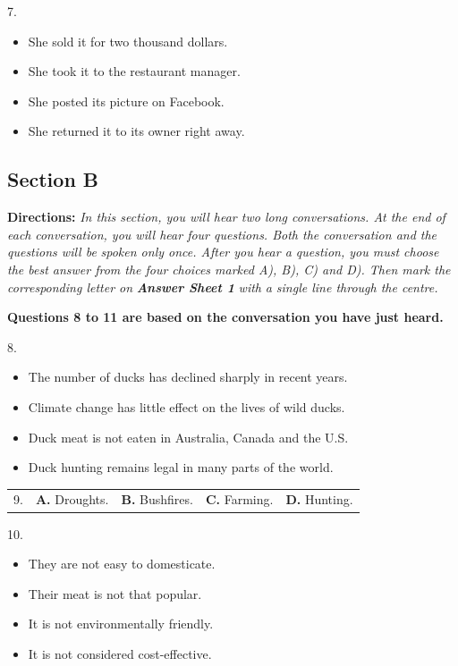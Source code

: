 \documentclass[UTF8,11pt]{ctexart}
\begin{document}
7.


\begin{itemize}[leftmargin=2em,itemsep=.2em,topsep=.4em]\item[A.] She sold it for two thousand dollars.
\item[B.] She took it to the restaurant manager.
\item[C.] She posted its picture on Facebook.
\item[D.] She returned it to its owner right away.
\end{itemize}

\subsection*{\textbf{Section B}}


\textbf{Directions: }\textit{In this section, you will hear two long conversations. At the end of each} \textit{conversation, you will hear four questions. Both the conversation and the questions will be} \textit{spoken only once. After you hear a question, you must choose the best answer from the four} \textit{choices marked A), B), C) and D). Then mark the corresponding letter on }\textbf{\textit{Answer Sheet 1 }}\textit{with} \textit{a single line through the centre.}


\textbf{Questions 8 to 11 are based on the conversation you have just heard.}


8.


\begin{itemize}[leftmargin=2em,itemsep=.2em,topsep=.4em]\item[A.] The number of ducks has declined sharply in recent years.
\item[B.] Climate change has little effect on the lives of wild ducks.
\item[C.] Duck meat is not eaten in Australia, Canada and the U.S.
\item[D.] Duck hunting remains legal in many parts of the world.
\end{itemize}

\noindent\begin{tabularx}{\linewidth}{@{}lXXXX@{}}9. & \textbf{A.} Droughts. & \textbf{B.} Bushfires. & \textbf{C.} Farming. & \textbf{D.} Hunting.\\\end{tabularx}\par

10.


\begin{itemize}[leftmargin=2em,itemsep=.2em,topsep=.4em]\item[A.] They are not easy to domesticate.
\item[B.] Their meat is not that popular.
\item[C.] It is not environmentally friendly.
\item[D.] It is not considered cost-effective.
\end{itemize}
\end{document}
